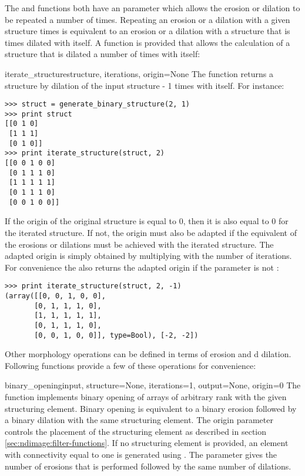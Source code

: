 The  and  functions both
have an  parameter which allows the erosion or dilation to 
be repeated a number of times. Repeating an erosion or a dilation with a 
given structure  times is equivalent to an erosion or a 
dilation with a structure that is  times dilated with itself. 
A function is provided that allows the calculation of a structure that is 
dilated a number of times with itself:

\begin{funcdesc}{iterate_structure}{structure, iterations, origin=None} 
  The  function returns a structure by dilation 
  of the input structure  - 1 times with itself. For 
  instance:
  \begin{verbatim}
>>> struct = generate_binary_structure(2, 1)
>>> print struct
[[0 1 0]
 [1 1 1]
 [0 1 0]]
>>> print iterate_structure(struct, 2)
[[0 0 1 0 0]
 [0 1 1 1 0]
 [1 1 1 1 1]
 [0 1 1 1 0]
 [0 0 1 0 0]]
\end{verbatim}
  If the origin of the original structure is equal to 0, then it is also 
  equal to 0 for the iterated structure. If not, the origin must also be 
  adapted if the equivalent of the  erosions or dilations 
  must be achieved with the iterated structure. The adapted origin is 
  simply obtained by multiplying with the number of iterations. For 
  convenience the
   also returns the adapted origin if the
   parameter is not :
\begin{verbatim}
>>> print iterate_structure(struct, 2, -1)
(array([[0, 0, 1, 0, 0],
       [0, 1, 1, 1, 0],
       [1, 1, 1, 1, 1],
       [0, 1, 1, 1, 0],
       [0, 0, 1, 0, 0]], type=Bool), [-2, -2])
\end{verbatim}
\end{funcdesc}

Other morphology operations can be defined in terms of erosion and d
dilation. Following functions provide a few of these operations for 
convenience:

\begin{funcdesc}{binary_opening}{input, structure=None, iterations=1,
  output=None, origin=0} The  function implements
  binary opening of arrays of arbitrary rank with the given structuring
  element. Binary opening is equivalent to a binary erosion followed by a
  binary dilation with the same structuring element. The origin parameter
  controls the placement of the structuring element as described in section
  \ref{sec:ndimage:filter-functions}. If no structuring element is 
  provided, an element with connectivity equal to one is generated using
  . The  parameter 
  gives the number of erosions that is performed followed by the same 
  number of dilations.
\end{funcdesc}

